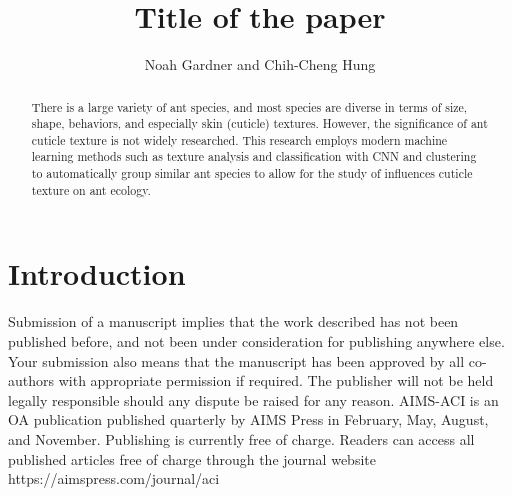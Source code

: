 \documentclass{aci}
\begin{document}
\title{Title of the paper}

\author{%
  Noah Gardner and Chih-Cheng Hung\corrauth}


\address{%
}


\begin{abstract}
  There is a large variety of ant species, and most species are diverse in terms
  of size, shape, behaviors, and especially skin (cuticle) textures. However,
  the significance of ant cuticle texture is not widely researched. This
  research employs modern machine learning methods such as texture analysis and
  classification with CNN and clustering to automatically group similar ant
  species to allow for the study of influences cuticle texture on ant
  ecology.

\end{abstract}




\maketitle

\section{Introduction}

Submission of a manuscript implies that the work described has not been
published before, and not been under consideration for publishing anywhere else.
Your submission also means that the manuscript has been approved by all
co-authors with appropriate permission if required. The publisher will not be
held legally responsible should any dispute be raised for any reason. AIMS-ACI
is an OA publication published quarterly by AIMS Press in February, May, August,
and November. Publishing is currently free of charge. Readers can access all
published articles free of charge through the journal website
https://aimspress.com/journal/aci
\end{document}

